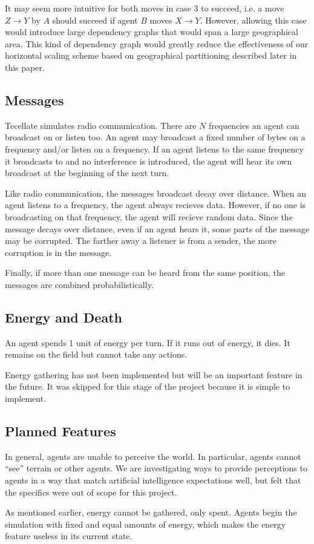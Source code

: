 It may seem more intuitive for both moves in case 3 to succeed, i.e. a move $Z\rightarrow Y$ by $A$
should succeed if agent $B$ moves $X\rightarrow Y$. However, allowing this case would introduce
large dependency graphs that would span a large geographical area. This kind of dependency graph
would greatly reduce the effectiveness of our horizontal scaling scheme based on geographical
partitioning described later in this paper.

\subsection{Messages}

Tecellate simulates radio communication. There are $N$ frequencies an agent can broadcast on or
listen too. An agent may broadcast a fixed number of bytes on a frequency and/or listen on a
frequency. If an agent listens to the same frequency it broadcasts to and no interference is
introduced, the agent will hear its own broadcast at the beginning of the next turn.

Like radio communication, the messages broadcast decay over distance. When an agent listens to a
frequency, the agent always recieves data. However, if no one is broadcasting on that frequency, the
agent will recieve random data. Since the message decays over distance, even if an agent hears it,
some parts of the message may be corrupted. The farther away a listener is from a sender, the more
corruption is in the message.

Finally, if more than one message can be heard from the same position, the messages are combined
probabilistically.

\subsection{Energy and Death}

An agent spends 1 unit of energy per turn. If it runs out of energy, it dies. It remains on the
field but cannot take any actions.

Energy gathering has not been implemented but will be an important feature in the future. It was
skipped for this stage of the project because it is simple to implement.

\subsection{Planned Features}

In general, agents are unable to perceive the world. In particular, agents cannot ``see'' terrain or
other agents. We are investigating ways to provide perceptions to agents in a way that match
artificial intelligence expectations well, but felt that the specifics were out of scope for this
project.

As mentioned earlier, energy cannot be gathered, only spent. Agents begin the simulation with fixed
and equal amounts of energy, which makes the energy feature useless in its current state.
